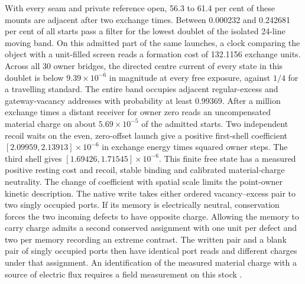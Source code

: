 With every seam and private reference open, 56.3 to 61.4 per cent of
these mounts are adjacent after two exchange times. Between 0.000232 and
0.242681 per cent of all starts pass a filter for the lowest doublet of
the isolated 24-line moving band. On this admitted part of the same
launches, a clock comparing the object with a unit-filled screen reads a
formation cost of 132.1156 exchange units. Across all 30 owner bridges,
the directed centre current of every state in this doublet is below
$9.39\times10^{-6}$ in magnitude at every free exposure, against
$1/4$ for a travelling standard. The entire band occupies adjacent
regular-excess and gateway-vacancy addresses with probability at least
0.99369. After a million exchange times a distant receiver for owner zero
reads an uncompensated material charge on about $5.69\times10^{-5}$ of
the admitted starts. Two independent recoil waits on the even, zero-offset
launch give a positive first-shell coefficient
$[2.09959,2.13913]\times10^{-6}$ in exchange energy times squared owner
steps. The third shell gives $[1.69426,1.71545]\times10^{-6}$.
This finite free state has a measured positive resting cost and recoil,
stable binding and calibrated material-charge neutrality. The change of
coefficient with spatial scale limits the point-owner kinetic description.
The native write takes either ordered vacancy--excess pair to two singly
occupied ports. If its memory is electrically neutral, conservation
forces the two incoming defects to have opposite charge. Allowing the
memory to carry charge admits a second conserved assignment with one unit
per defect and two per memory recording an extreme contrast. The written pair
and a blank pair of singly occupied ports then have identical port reads
and different charges under that assignment.
An identification of the measured material charge with a source of
electric flux requires a field measurement on this stock \cite{ophmodel}.

